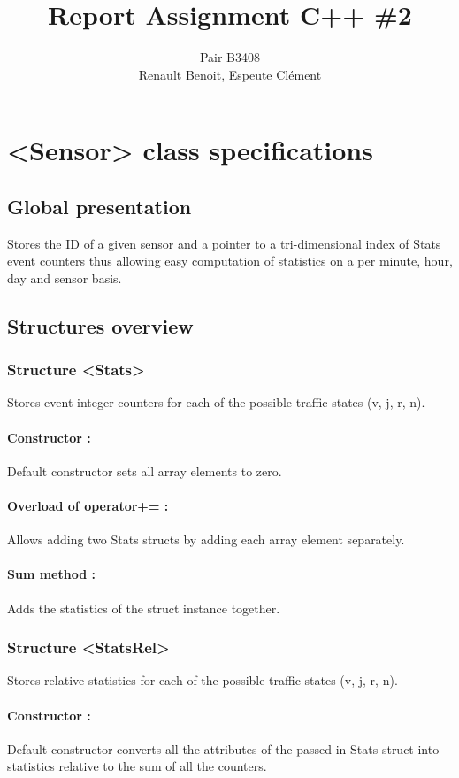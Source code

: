 \documentclass[10pt]{article}
\title{Report Assignment C++ \#2}
\author{Pair B3408 \\ {\sc Renault} Benoit, {\sc Espeute} Clément}
\date{}
\begin{document}
\pagestyle{fancy}
\maketitle
\section{<Sensor> class specifications}
\subsection{Global presentation}
Stores the ID of a given sensor and a pointer to a tri-dimensional index of Stats event counters thus allowing easy computation of statistics on a per minute, hour, day and sensor basis.

\subsection{Structures overview}
\subsubsection*{Structure <Stats>}
Stores event integer counters for each of the possible traffic states (v, j, r, n).

\paragraph{Constructor :}
Default constructor sets all array elements to zero.

\paragraph{Overload of operator+= :}
Allows adding two Stats structs by adding each array element separately.

\paragraph{Sum method :}
Adds the statistics of the struct instance together.

\subsubsection*{Structure <StatsRel>}
Stores relative statistics for each of the possible traffic states (v, j, r, n).

\paragraph{Constructor :}
Default constructor converts all the attributes of the passed in Stats struct into statistics relative to the sum of all the counters.
\end{document}
